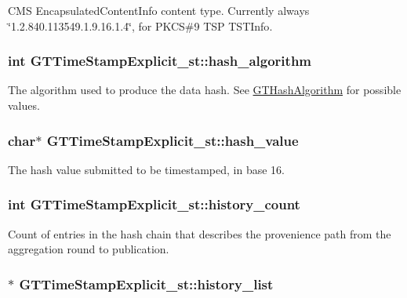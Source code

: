 \label{struct_g_t_time_stamp_explicit__st_ac79a05fdadd73abab51336ae85191b52}
CMS {\ttfamily EncapsulatedContentInfo} content type. Currently always \char`\"{}1.2.840.113549.1.9.16.1.4\char`\"{}, for PKCS\#9 TSP {\ttfamily TSTInfo}. \hypertarget{struct_g_t_time_stamp_explicit__st_a1bda18a06c71e3fe540d689e0dd1d7db}{
\subsubsection[{hash\_\-algorithm}]{\setlength{\rightskip}{0pt plus 5cm}int {\bf GTTimeStampExplicit\_\-st::hash\_\-algorithm}}}
\label{struct_g_t_time_stamp_explicit__st_a1bda18a06c71e3fe540d689e0dd1d7db}
The algorithm used to produce the data hash. See \hyperlink{group__common_ga5110e02245c37b4ff48ea4c4efb2924a}{GTHashAlgorithm} for possible values. \hypertarget{struct_g_t_time_stamp_explicit__st_af9ddeae2cea40103299b75f9d5c32b82}{
\subsubsection[{hash\_\-value}]{\setlength{\rightskip}{0pt plus 5cm}char$\ast$ {\bf GTTimeStampExplicit\_\-st::hash\_\-value}}}
\label{struct_g_t_time_stamp_explicit__st_af9ddeae2cea40103299b75f9d5c32b82}
The hash value submitted to be timestamped, in base 16. \hypertarget{struct_g_t_time_stamp_explicit__st_adce3816eed0492b7ad965a7749d51ef1}{
\subsubsection[{history\_\-count}]{\setlength{\rightskip}{0pt plus 5cm}int {\bf GTTimeStampExplicit\_\-st::history\_\-count}}}
\label{struct_g_t_time_stamp_explicit__st_adce3816eed0492b7ad965a7749d51ef1}
Count of entries in the hash chain that describes the provenience path from the aggregation round to publication. \hypertarget{struct_g_t_time_stamp_explicit__st_afe631a5415e03342c5381923f5772c7f}{
\subsubsection[{history\_\-list}]{$\ast$ {\bf GTTimeStampExplicit\_\-st::history\_\-list}}}
